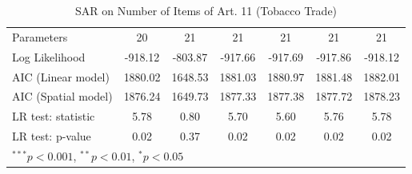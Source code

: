 \begin{table}[!h]
\begin{center}
\begin{tabular}{l c c c c c c }
Parameters              & 20           & 21           & 21           & 21           & 21           & 21           \\
Log Likelihood          & -918.12      & -803.87      & -917.66      & -917.69      & -917.86      & -918.12      \\
AIC (Linear model)      & 1880.02      & 1648.53      & 1881.03      & 1880.97      & 1881.48      & 1882.01      \\
AIC (Spatial model)     & 1876.24      & 1649.73      & 1877.33      & 1877.38      & 1877.72      & 1878.23      \\
LR test: statistic      & 5.78         & 0.80         & 5.70         & 5.60         & 5.76         & 5.78         \\
LR test: p-value        & 0.02         & 0.37         & 0.02         & 0.02         & 0.02         & 0.02         \\
\bottomrule
\multicolumn{7}{l}{\scriptsize{$^{***}p<0.001$, $^{**}p<0.01$, $^*p<0.05$}}
\end{tabular}
\caption{SAR on Number of Items of Art. 11 (Tobacco Trade)}
\label{table:coefficients}
\end{center}
\end{table}
